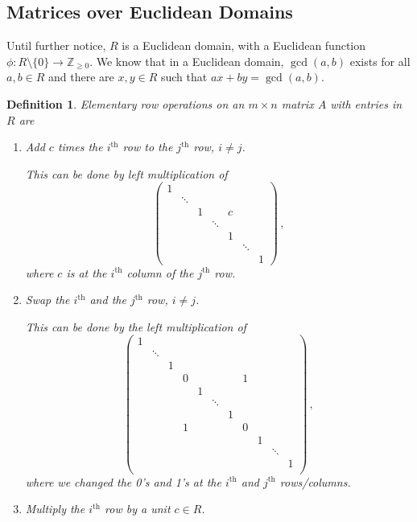 \documentclass{article}
\theoremstyle{plain}\theoremheaderfont{\normalfont\itshape}\theorembodyfont{\rmfamily}\theoremseparator{.}\newtheorem*{rem}{Remark}\newtheorem*{ex}{Example}\newtheorem*{proof}{Proof}\newtheorem*{altp}{Alternative proof}\newtheorem*{nonex}{Non-Example}
\theoremstyle{plain}\theoremheaderfont{\normalfont\bfseries}\theorembodyfont{\rmfamily}\theoremseparator{.}\newtheorem{thm}{Theorem}[section]\newtheorem{lem}[thm]{Lemma}\newtheorem{prop}[thm]{Proposition}\newtheorem*{cor}{Corollary}\newtheorem{defn}[thm]{Definition}\newtheorem{clm}[thm]{Claim}\newtheorem{clminproof}{Claim}\newtheorem*{notn}{Notation}\newtheorem*{exer}{Exercise}\newtheorem*{lemnn}{Lemma}
\theoremstyle{break}\theoremheaderfont{\normalfont\itshape}\theorembodyfont{\rmfamily}\theoremseparator{.\medskip}\newtheorem*{proofskip}{Proof}\newtheorem*{exs}{Examples}\newtheorem*{rems}{Remarks}\newtheorem*{obs}{Observations}
\theoremstyle{break}\theoremheaderfont{\normalfont\bfseries}\theorembodyfont{\rmfamily}\theoremseparator{.\medskip}\newtheorem{lemskip}[thm]{Lemma}\newtheorem{defnskip}[thm]{Definition}\newtheorem{propskip}[thm]{Proposition}\newtheorem{thmskip}[thm]{Theorem}
\numberwithin{equation}{section}
\newcommand{\ZZ}{\mathbb{Z}}
\begin{document}
    \subsection{Matrices over Euclidean Domains}
    Until further notice, \(R\) is a Euclidean domain, with a Euclidean function \(\phi: R\setminus\{0\}\to\ZZ_{\ge 0}\). We know that in a Euclidean domain, \(\gcd(a,b)\) exists for all \(a,b\in R\) and there are \(x,y\in R\) such that \(ax+by=\gcd(a,b)\).
    \begin{defn}
        \textit{Elementary row operations} on an \(m\times n\) matrix \(A\) with entries in \(R\) are
        \begin{enumerate}[topsep=0pt,leftmargin=35pt]
            \item[(ER1)] Add \(c\) times the \(i^{\text{th}}\) row to the \(j^{\text{th}}\) row, \(i\ne j\).
            
            This can be done by left multiplication of
            \[\begin{pmatrix}
                1 \\
                ~ & \ddots \\
                ~ & ~ & 1 & ~ & c\\
                ~ & ~ & ~ & \ddots\\
                ~ & ~ & ~ & ~ & 1\\
                ~ & ~ & ~ & ~ & ~ & \ddots\\
                ~ & ~ & ~ & ~ & ~ & ~ & 1
            \end{pmatrix}\,,\]
            where \(c\) is at the \(i^{\text{th}}\) column of the \(j^{\text{th}}\) row.
            \item[(ER2)] Swap the \(i^{\text{th}}\) and the \(j^{\text{th}}\) row, \(i\ne j\).
            
            This can be done by the left multiplication of
            \setcounter{MaxMatrixCols}{11}
            \[\begin{pmatrix}
                1 \\
                ~ & \ddots \\
                ~ & ~ & 1 \\
                ~ & ~ & ~ & 0 & ~ & ~ & ~ & 1\\
                ~ & ~ & ~ & ~ & 1\\
                ~ & ~ & ~ & ~ & ~ & \ddots \\
                ~ & ~ & ~ & ~ & ~ & ~ & 1 \\
                ~ & ~ & ~ & 1 & ~ & ~ & ~ & 0\\
                ~ & ~ & ~ & ~ & ~ & ~ & ~ & ~ & 1\\
                ~ & ~ & ~ & ~ & ~ & ~ & ~ & ~ & ~ & \ddots\\
                ~ & ~ & ~ & ~ & ~ & ~ & ~ & ~ & ~ & ~ & 1\\
            \end{pmatrix}\,,\]
            where we changed the 0's and 1's at the \(i^{\text{th}}\) and \(j^{\text{th}}\) rows/columns.
            \item[(ER3)] Multiply the \(i^{\text{th}}\) row by a unit \(c\in R\).
            

\end{enumerate}
\end{defn}
\end{document}
